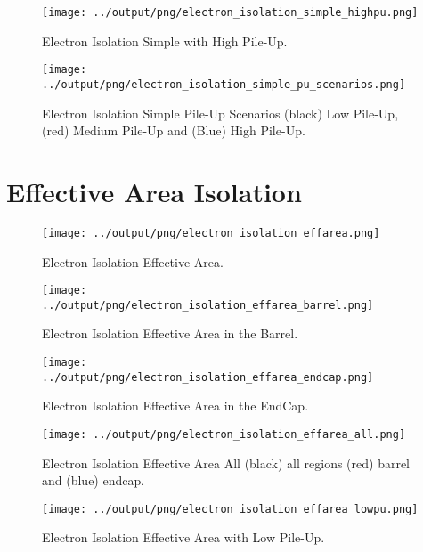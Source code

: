 \documentclass[11pt]{book}
\begin{document}
\begin{figure}[htbp]
\centering
\texttt{[image: ../output/png/electron\_isolation\_simple\_highpu.png]}
\caption{Electron Isolation Simple with High Pile-Up.}
\label{fig:electron_isolation_simple_highpu}
\end{figure}

\begin{figure}[htbp]
\centering
\texttt{[image: ../output/png/electron\_isolation\_simple\_pu\_scenarios.png]}
\caption{Electron Isolation Simple Pile-Up Scenarios (black) Low Pile-Up, (red) Medium Pile-Up and (Blue) High Pile-Up.}
\label{fig:electron_isolation_simple_pu_scenarios}
\end{figure}
\clearpage


\chapter{Effective Area Isolation}
\begin{figure}[htbp]
\centering
\texttt{[image: ../output/png/electron\_isolation\_effarea.png]}
\caption{Electron Isolation Effective Area.}
\label{fig:electron_isolation_effarea}
\end{figure}

\begin{figure}[htbp]
\centering
\texttt{[image: ../output/png/electron\_isolation\_effarea\_barrel.png]}
\caption{Electron Isolation Effective Area in the Barrel.}
\label{fig:electron_isolation_effarea_barrel}
\end{figure}

\begin{figure}[htbp]
\centering
\texttt{[image: ../output/png/electron\_isolation\_effarea\_endcap.png]}
\caption{Electron Isolation Effective Area in the EndCap.}
\label{fig:electron_isolation_effarea_endcap}
\end{figure}

\begin{figure}[htbp]
\centering
\texttt{[image: ../output/png/electron\_isolation\_effarea\_all.png]}
\caption{Electron Isolation Effective Area All (black) all regions (red) barrel and (blue) endcap.}
\label{fig:electron_isolation_effarea_all}
\end{figure}

\begin{figure}[htbp]
\centering
\texttt{[image: ../output/png/electron\_isolation\_effarea\_lowpu.png]}
\caption{Electron Isolation Effective Area with Low Pile-Up.}
\label{fig:electron_isolation_effarea_lowpu}
\end{figure}
\end{document}
